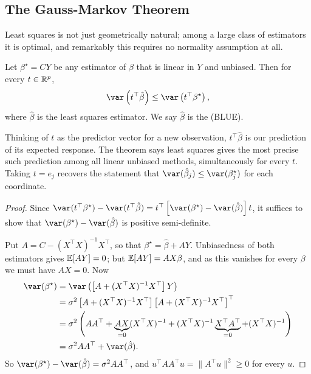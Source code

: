 \documentclass[a4paper]{scrartcl}
\begin{document}
\subsection{The Gauss-Markov Theorem}

Least squares is not just geometrically natural; among a large class of estimators it is optimal, and remarkably this requires no normality assumption at all.

\begin{theorem}
  Let $\beta^\star = CY$ be any estimator of $\beta$ that is linear in $Y$ and unbiased. Then for every $t\in\mathbb{R}^p$,
  $$
  \var\left(t^\top\hat\beta\right) \leq \var\left(t^\top\beta^\star\right),
  $$
  where $\hat\beta$ is the least squares estimator. We say $\hat\beta$ is the  (BLUE).
\end{theorem}

\begin{remark}
  Thinking of $t$ as the predictor vector for a new observation, $t^\top\hat\beta$ is our prediction of its expected response. The theorem says least squares gives the most precise such prediction among all linear unbiased methods, simultaneously for every $t$. Taking $t = e_j$ recovers the statement that $\var(\hat\beta_j)\leq\var(\beta_j^\star)$ for each coordinate.
\end{remark}

\begin{proof}
  Since $\var(t^\top\beta^\star) - \var(t^\top\hat\beta) = t^\top\left[\var(\beta^\star)-\var(\hat\beta)\right]t$, it suffices to show that $\var(\beta^\star)-\var(\hat\beta)$ is positive semi-definite.

  Put $A = C - (X^\top X)^{-1}X^\top$, so that $\beta^\star = \hat\beta + AY$. Unbiasedness of both estimators gives $\mathbb{E}[AY] = 0$; but $\mathbb{E}[AY] = AX\beta$, and as this vanishes for every $\beta$ we must have $AX = 0$. Now
  \begin{align*}
    \var(\beta^\star) &= \var\left(\left[A + (X^\top X)^{-1}X^\top\right]Y\right)\\
    &= \sigma^2\left[A + (X^\top X)^{-1}X^\top\right]\left[A+(X^\top X)^{-1}X^\top\right]^\top\\
    &= \sigma^2\left(AA^\top + \underbrace{AX}_{=0}(X^\top X)^{-1} + (X^\top X)^{-1}\underbrace{X^\top A^\top}_{=0} + (X^\top X)^{-1}\right)\\
    &= \sigma^2 AA^\top + \var(\hat\beta).
  \end{align*}
  So $\var(\beta^\star)-\var(\hat\beta) = \sigma^2 AA^\top$, and $u^\top AA^\top u = \|A^\top u\|^2\geq 0$ for every $u$.
\end{proof}
\end{document}
